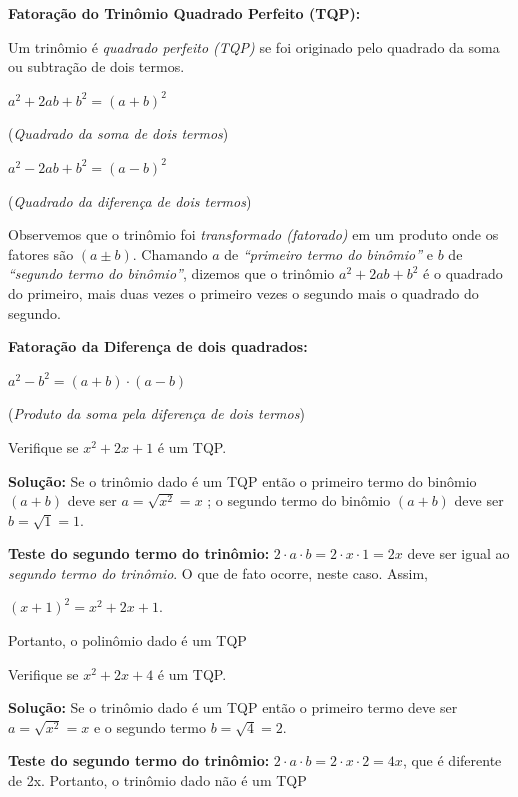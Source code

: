 \textbf{Fatoração do Trinômio Quadrado Perfeito (TQP):}

Um trinômio é \textit{quadrado perfeito (TQP)} se foi originado pelo quadrado da soma ou subtração de dois termos.

\begin{multicols}{2}
$a^2 + 2ab + b^2 = (a + b)^2$

(\textit{Quadrado da soma de dois termos})
\end{multicols}

\begin{multicols}{2}
$a^2 - 2ab + b^2 = (a - b)^2$

(\textit{Quadrado da diferença de dois termos})
\end{multicols}

Observemos que o trinômio foi \textit{transformado (fatorado)} em um produto onde os fatores são $(a \pm b)$. Chamando $a$ de \textit{“primeiro termo do binômio”} e $b$ de \textit{“segundo termo do binômio”}, dizemos que o trinômio $a^2 + 2ab + b^2$ é o quadrado do primeiro, mais duas vezes o primeiro vezes o segundo mais o quadrado do segundo.

\textbf{Fatoração da Diferença de dois quadrados:}

\begin{multicols}{2}
$a^2 - b^2 = (a+b) \cdot (a - b)$

(\textit{Produto da soma pela diferença de dois termos})
\end{multicols}

\begin{texemplo}
Verifique se $x^2 + 2x + 1$ é um TQP.

\textbf{Solução:} Se o trinômio dado é um TQP então o primeiro termo do binômio $(a+b)$ deve ser $a = \sqrt{x^2} = x$  ; o segundo termo do binômio $(a+b)$ deve ser $b = \sqrt{1} = 1$.

\textbf{Teste do segundo termo do trinômio:}  $2 \cdot a \cdot b = 2 \cdot x \cdot 1 = 2x$  deve ser igual ao \textit{segundo termo do trinômio}. O que de fato ocorre, neste caso. Assim,

\begin{center} $(x + 1)^2 = x^2 + 2x + 1$. \end{center}

Portanto, o polinômio dado é um TQP \qedsymbol{}

\end{texemplo}

\begin{texemplo}
Verifique se $x^2 + 2x + 4$ é um TQP.

\textbf{Solução:} Se o trinômio dado é um TQP então o primeiro termo deve ser $a = \sqrt{x^2} = x$ e o segundo termo $b = \sqrt{4} = 2$.

\textbf{Teste do segundo termo do trinômio:}  $2 \cdot a \cdot b = 2 \cdot x \cdot 2 = 4x$, que é diferente de 2x. Portanto, o trinômio dado não é um TQP \qedsymbol{}

\end{texemplo}


